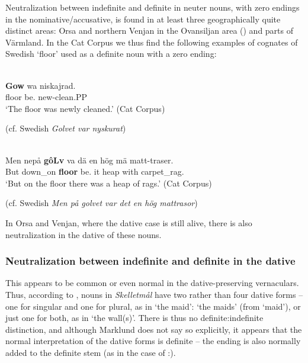Neutralization between indefinite and definite in neuter nouns, with zero endings in the nominative/accusative, is found in at least three geographically quite distinct areas: Orsa and northern Venjan in the Ovansiljan area (\citet[133]{Levander1928}) and parts of Värmland. In the Cat Corpus we thus find the following examples of cognates of Swedish  ‘floor’ used as a definite noun with a zero ending:

\ea\label{}
\\
\gll	\textbf{Gow} wa  niskajrad.\\
		floor  be.{\pst}  new-clean.PP\\
\glt 	‘The floor was newly cleaned.’ (Cat Corpus)

\z

(cf. Swedish \textit{Golvet var nyskurat}) 


\ea\label{}
\\
\gll	Men  nepå  \textbf{gôLv} va  dä  en  hög  mä  matt-traser.\\
		But  down\_on  \textbf{floor} be.{\pst}  it  {\indf}  heap  with  carpet\_rag.{\pl}\\
\glt	‘But on the floor there was a heap of rags.’ (Cat Corpus)

\z

(cf. Swedish \textit{Men på golvet var det en hög mattrasor})


In Orsa and Venjan, where the dative case is still alive, there is also neutralization in the dative of these nouns. 

\subsubsection{Neutralization between indefinite and definite in the dative}
 This appears to be common or even normal in the dative-preserving vernaculars. Thus, according to \citet{Marklund1976}, nouns in \textit{Skelletmål} have two rather than four dative forms – one for singular and one for plural, as in  ‘the maid’:  ‘the maids’ (from  ‘maid’), or just one for both, as in ‘the wall(s)’. There is thus no definite:indefinite distinction, and although Marklund does not say so explicitly, it appears that the normal interpretation of the dative forms is definite – the ending is also normally added to the definite stem (as in the case of :).


